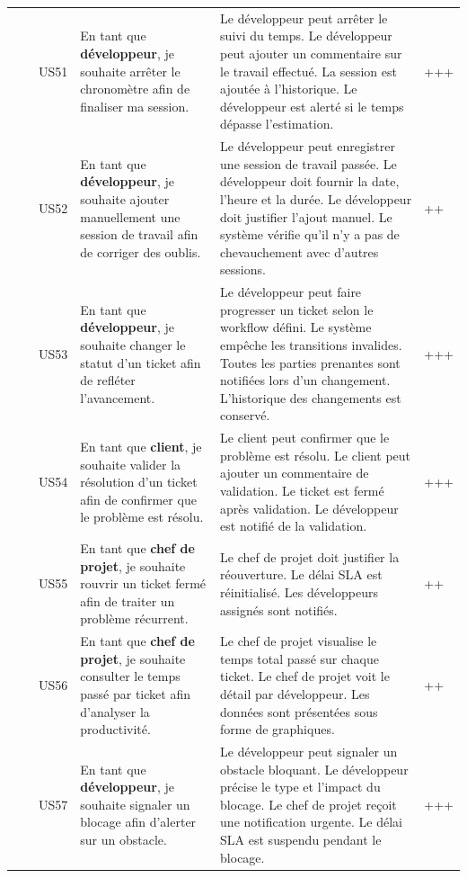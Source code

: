 \begin{longtable}{|C{0.7cm}|C{2.3cm}|M{1.0cm}|>{\raggedright\arraybackslash}p{4.2cm}|>{\raggedright\arraybackslash}p{4cm}|M{1.1cm}|}
& & US51 & En tant que \textbf{développeur}, je souhaite arrêter le chronomètre afin de finaliser ma session. 
& Le développeur peut arrêter le suivi du temps. Le développeur peut ajouter un commentaire sur le travail effectué. La session est ajoutée à l'historique. Le développeur est alerté si le temps dépasse l'estimation. & +++ \\
& & US52 & En tant que \textbf{développeur}, je souhaite ajouter manuellement une session de travail afin de corriger des oublis. 
& Le développeur peut enregistrer une session de travail passée. Le développeur doit fournir la date, l'heure et la durée. Le développeur doit justifier l'ajout manuel. Le système vérifie qu'il n'y a pas de chevauchement avec d'autres sessions. & ++ \\
& & US53 & En tant que \textbf{développeur}, je souhaite changer le statut d'un ticket afin de refléter l'avancement. 
& Le développeur peut faire progresser un ticket selon le workflow défini. Le système empêche les transitions invalides. Toutes les parties prenantes sont notifiées lors d'un changement. L'historique des changements est conservé. & +++ \\
& & US54 & En tant que \textbf{client}, je souhaite valider la résolution d'un ticket afin de confirmer que le problème est résolu. 
& Le client peut confirmer que le problème est résolu. Le client peut ajouter un commentaire de validation. Le ticket est fermé après validation. Le développeur est notifié de la validation. & +++ \\
& & US55 & En tant que \textbf{chef de projet}, je souhaite rouvrir un ticket fermé afin de traiter un problème récurrent. 
& Le chef de projet doit justifier la réouverture. Le délai SLA est réinitialisé. Les développeurs assignés sont notifiés. & ++ \\
& & US56 & En tant que \textbf{chef de projet}, je souhaite consulter le temps passé par ticket afin d'analyser la productivité. 
& Le chef de projet visualise le temps total passé sur chaque ticket. Le chef de projet voit le détail par développeur. Les données sont présentées sous forme de graphiques. & ++ \\
& & US57 & En tant que \textbf{développeur}, je souhaite signaler un blocage afin d'alerter sur un obstacle. 
& Le développeur peut signaler un obstacle bloquant. Le développeur précise le type et l'impact du blocage. Le chef de projet reçoit une notification urgente. Le délai SLA est suspendu pendant le blocage. & +++ \\

\end{longtable}
